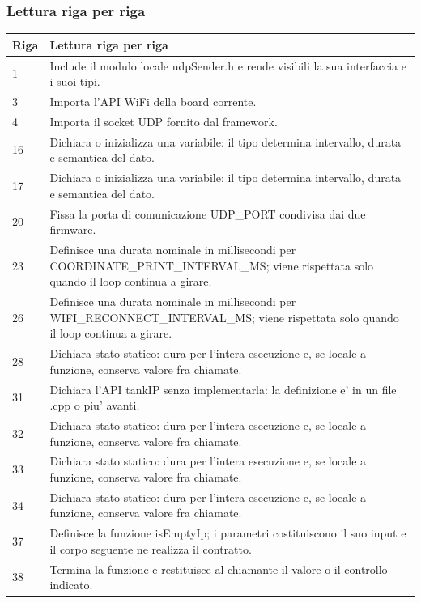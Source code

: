 \documentclass[11pt,a4paper]{article}
\begin{document}
\subsubsection{Lettura riga per riga}
\begin{longtable}{p{}p{}}
\toprule
\textbf{Riga} & \textbf{Lettura riga per riga} \\
\midrule
\endhead
1 & Include il modulo locale udpSender.h e rende visibili la sua interfaccia e i suoi tipi. \\
3 & Importa l'API WiFi della board corrente. \\
4 & Importa il socket UDP fornito dal framework. \\
16 & Dichiara o inizializza una variabile: il tipo determina intervallo, durata e semantica del dato. \\
17 & Dichiara o inizializza una variabile: il tipo determina intervallo, durata e semantica del dato. \\
20 & Fissa la porta di comunicazione UDP\_\allowbreak{}PORT condivisa dai due firmware. \\
23 & Definisce una durata nominale in millisecondi per COORDINATE\_\allowbreak{}PRINT\_\allowbreak{}INTERVAL\_\allowbreak{}MS; viene rispettata solo quando il loop continua a girare. \\
26 & Definisce una durata nominale in millisecondi per WIFI\_\allowbreak{}RECONNECT\_\allowbreak{}INTERVAL\_\allowbreak{}MS; viene rispettata solo quando il loop continua a girare. \\
28 & Dichiara stato statico: dura per l'intera esecuzione e, se locale a funzione, conserva valore fra chiamate. \\
31 & Dichiara l'API tankIP senza implementarla: la definizione e' in un file .cpp o piu' avanti. \\
32 & Dichiara stato statico: dura per l'intera esecuzione e, se locale a funzione, conserva valore fra chiamate. \\
33 & Dichiara stato statico: dura per l'intera esecuzione e, se locale a funzione, conserva valore fra chiamate. \\
34 & Dichiara stato statico: dura per l'intera esecuzione e, se locale a funzione, conserva valore fra chiamate. \\
37 & Definisce la funzione isEmptyIp; i parametri costituiscono il suo input e il corpo seguente ne realizza il contratto. \\
38 & Termina la funzione e restituisce al chiamante il valore o il controllo indicato. \\

\end{longtable}
\end{document}
